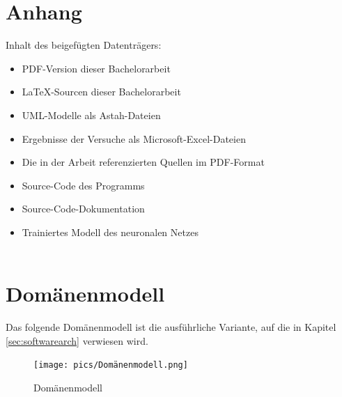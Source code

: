 \documentclass[12pt,a4paper,bibliography=totocnumbered,listof=totocnumbered]{article}
\begin{document}
\setcounter{page}{1}
\rhead{} 
\begin{appendix}
\section*{Anhang}
{}

Inhalt des beigefügten Datenträgers:
\begin{itemize}
  \item PDF-Version dieser Bachelorarbeit
  \item \LaTeX -Sourcen dieser Bachelorarbeit
  \item UML-Modelle als Astah-Dateien
  \item Ergebnisse der Versuche als Microsoft-Excel-Dateien
  \item Die in der Arbeit referenzierten Quellen im PDF-Format
  \item Source-Code des Programms
  \item Source-Code-Dokumentation
  \item Trainiertes Modell des neuronalen Netzes\\\\
\end{itemize}

\section{Domänenmodell}
Das folgende Domänenmodell ist die ausführliche Variante, auf die in Kapitel \ref{sec:softwarearch} verwiesen wird. 

\begin{figure}[h]
\centering
\texttt{[image: pics/Domänenmodell.png]}
\caption{Domänenmodell}
\label{abb:domainmodell-complete}
\end{figure}


\end{appendix}


\pagebreak
\end{document}
